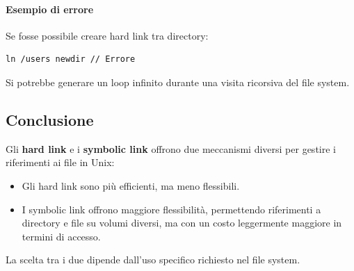 \paragraph{Esempio di errore}
Se fosse possibile creare hard link tra directory:
\begin{verbatim}
ln /users newdir // Errore
\end{verbatim}
Si potrebbe generare un loop infinito durante una visita ricorsiva del file system.

\subsection{Conclusione}
Gli \textbf{hard link} e i \textbf{symbolic link} offrono due meccanismi diversi per gestire i riferimenti ai file in Unix:
\begin{itemize}
    \item Gli hard link sono più efficienti, ma meno flessibili.
    \item I symbolic link offrono maggiore flessibilità, permettendo riferimenti a directory e file su volumi diversi, ma con un costo leggermente maggiore in termini di accesso.
\end{itemize}
La scelta tra i due dipende dall'uso specifico richiesto nel file system.
